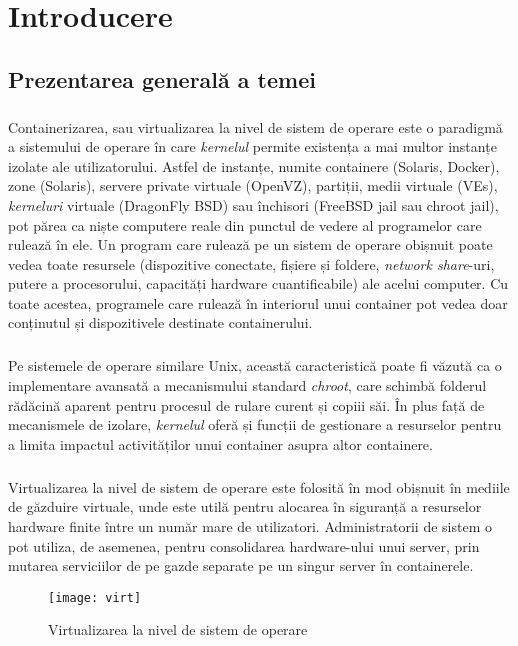 \chapter{Introducere}

\section{Prezentarea generală a temei}
    \paragraph{} Containerizarea, sau virtualizarea la nivel de sistem de operare este o paradigmă a sistemului de operare în care \textit{kernelul} permite existența a mai multor instanțe izolate ale utilizatorului. Astfel de instanțe, numite containere (Solaris, Docker), zone (Solaris), servere private virtuale (OpenVZ), partiții, medii virtuale (VEs), \textit{kerneluri} virtuale (DragonFly BSD) sau închisori (FreeBSD jail sau chroot jail), pot părea ca niște computere reale din punctul de vedere al programelor care rulează în ele. Un program care rulează pe un sistem de operare obișnuit poate vedea toate resursele (dispozitive conectate, fișiere și foldere, \textit{network share}-uri, putere a procesorului, capacități hardware cuantificabile) ale acelui computer. Cu toate acestea, programele care rulează în interiorul unui container pot vedea doar conținutul și dispozitivele destinate containerului. \cite{wiki:osv}
    \paragraph{} Pe sistemele de operare similare Unix, această caracteristică poate fi văzută ca o implementare avansată a mecanismului standard \textit{chroot}, care schimbă folderul rădăcină aparent pentru procesul de rulare curent și copiii săi. În plus față de mecanismele de izolare, \textit{kernelul} oferă și funcții de gestionare a resurselor pentru a limita impactul activităților unui container asupra altor containere. \cite{wiki:osv}
    \paragraph{} Virtualizarea la nivel de sistem de operare este folosită în mod obișnuit în mediile de găzduire virtuale, unde este utilă pentru alocarea în siguranță a resurselor hardware finite între un număr mare de utilizatori. Administratorii de sistem o pot utiliza, de asemenea, pentru consolidarea hardware-ului unui server, prin mutarea serviciilor de pe gazde separate pe un singur server în containerele. \cite{wiki:osv}
        \begin{figure}[h!]
            \centering
            \texttt{[image: virt]}
            \caption{Virtualizarea la nivel de sistem de operare}
            \label{fig:virt}
        \end{figure}
